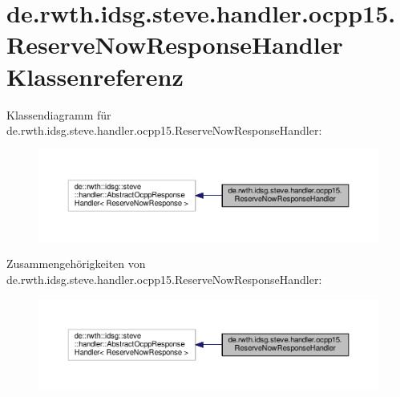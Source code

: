 \hypertarget{classde_1_1rwth_1_1idsg_1_1steve_1_1handler_1_1ocpp15_1_1_reserve_now_response_handler}{\section{de.\+rwth.\+idsg.\+steve.\+handler.\+ocpp15.\+Reserve\+Now\+Response\+Handler Klassenreferenz}
\label{classde_1_1rwth_1_1idsg_1_1steve_1_1handler_1_1ocpp15_1_1_reserve_now_response_handler}
}


Klassendiagramm für de.\+rwth.\+idsg.\+steve.\+handler.\+ocpp15.\+Reserve\+Now\+Response\+Handler\+:\nopagebreak
\begin{figure}[H]
\begin{center}
\leavevmode
\includegraphics[width=350pt]{classde_1_1rwth_1_1idsg_1_1steve_1_1handler_1_1ocpp15_1_1_reserve_now_response_handler__inherit__graph}
\end{center}
\end{figure}


Zusammengehörigkeiten von de.\+rwth.\+idsg.\+steve.\+handler.\+ocpp15.\+Reserve\+Now\+Response\+Handler\+:\nopagebreak
\begin{figure}[H]
\begin{center}
\leavevmode
\includegraphics[width=350pt]{classde_1_1rwth_1_1idsg_1_1steve_1_1handler_1_1ocpp15_1_1_reserve_now_response_handler__coll__graph}
\end{center}
\end{figure}
